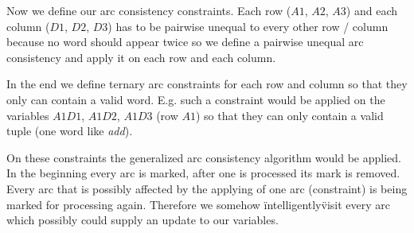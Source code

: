 \documentclass[10pt,a4paper]{article}
\begin{document}
\noindent Now we define our arc consistency constraints. Each row ($A1$, $A2$, $A3$) and each column ($D1$, $D2$, $D3$) has to be pairwise unequal to every other row / column because no word should appear twice so we define a pairwise unequal arc consistency and apply it on each row and each column.

\noindent In the end we define ternary arc constraints for each row and column so that they only can contain a valid word. E.g. such a constraint would be applied on the variables $A1D1$, $A1D2$, $A1D3$ (row $A1$) so that they can only contain a valid tuple (one word like \textit{add}).

\noindent On these constraints the generalized arc consistency algorithm would be applied. In the beginning every arc is marked, after one is processed its mark is removed. Every arc that is possibly affected by the applying of one arc (constraint) is being marked for processing again. Therefore we somehow \"intelligently\" visit every arc which possibly could supply an update to our variables.
\end{document}
